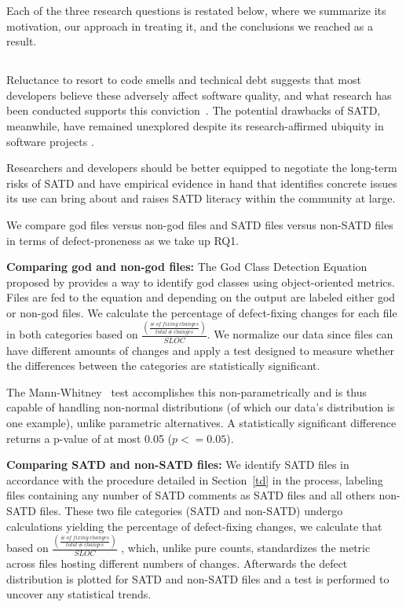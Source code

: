 Each of the three research questions is restated below, where we summarize its motivation, our approach in treating it, and the conclusions we reached as a result.

\subsection*{\chapterIVrqI}


Reluctance to resort to code smells and technical debt suggests that most developers believe these adversely affect software quality, and what research has been conducted supports this conviction~\cite{zazworka2011investigating}.  The potential drawbacks of SATD, meanwhile, have remained unexplored despite its research-affirmed ubiquity in software projects \cite{ICSM_PotdarS14}.

Researchers and developers should be better equipped to negotiate the long-term risks of SATD and have empirical evidence in hand that identifies concrete issues its use can bring about and raises SATD literacy within the community at large.


We compare god files versus non-god files and SATD files versus non-SATD files in terms of defect-proneness as we take up RQ1.


\noindent\textbf{Comparing god and non-god files:}
The God Class Detection Equation proposed by \cite{marinescu2004detection} provides a way to identify god classes using object-oriented metrics. Files are fed to the equation and depending on the output are labeled either god or non-god files. We calculate the percentage of defect-fixing changes for each file in both categories based on $\frac{\left (\frac{\#~of~fixing~changes}{total~\#~changes} \right )}{SLOC}$. We normalize our data since files can have different amounts of changes and apply a test designed to measure whether the differences between the categories are statistically significant.

The Mann-Whitney~\cite{mann1947test} test accomplishes this non-parametrically and is thus capable of handling non-normal distributions (of which our data's distribution is one example), unlike parametric alternatives. A statistically significant difference returns a p-value of at most 0.05 ($p <= 0.05$).


\noindent\textbf{Comparing SATD and non-SATD files:}
We identify SATD files in accordance with the procedure detailed in Section~\ref{td} in the process, labeling files containing any number of SATD comments as SATD files and all others non-SATD files. These two file categories (SATD and non-SATD) undergo calculations yielding the percentage of defect-fixing changes, we calculate that based on $\frac{\left (\frac{\#~of~fixing~changes}{total~\#~changes} \right )}{SLOC}$ , which, unlike pure counts, standardizes the metric across files hosting different numbers of changes. Afterwards the defect distribution is plotted for SATD and non-SATD files and a test is performed to uncover any statistical trends.

